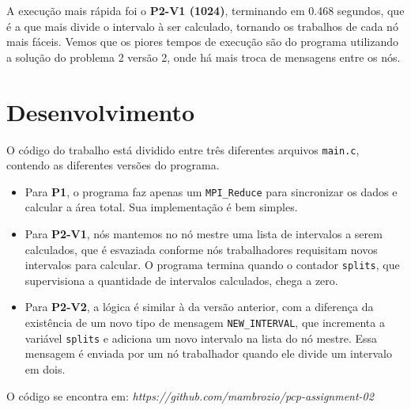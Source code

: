 \documentclass[12pt]{article}
\def\code#1{\texttt{#1}}
\begin{document}
A execução mais rápida foi o \textbf{P2-V1 (1024)}, terminando em 0.468 segundos, que é a que mais divide o intervalo à ser calculado, tornando os trabalhos de cada nó mais fáceis. Vemos que os piores tempos de execução são do programa utilizando a solução do problema 2 versão 2, onde há mais troca de mensagens entre os nós.

\section*{Desenvolvimento}

O código do trabalho está dividido entre três diferentes arquivos \code{main.c}, contendo as diferentes versões do programa.

\begin{itemize}
\item Para \textbf{P1}, o programa faz apenas um \code{MPI\_Reduce} para sincronizar os dados e calcular a área total. Sua implementação é bem simples.

\item Para \textbf{P2-V1}, nós mantemos no nó mestre uma lista de intervalos a serem calculados, que é esvaziada conforme nós trabalhadores requisitam novos intervalos para calcular. O programa termina quando o contador \code{splits}, que supervisiona a quantidade de intervalos calculados, chega a zero.

\item Para \textbf{P2-V2}, a lógica é similar à da versão anterior, com a diferença da existência de um novo tipo de mensagem \code{NEW\_INTERVAL}, que incrementa a variável \code{splits} e adiciona um novo intervalo na lista do nó mestre. Essa mensagem é enviada por um nó trabalhador quando ele divide um intervalo em dois.
\end{itemize}

O código se encontra em: \textit{https://github.com/mambrozio/pcp-assignment-02}
\end{document}
